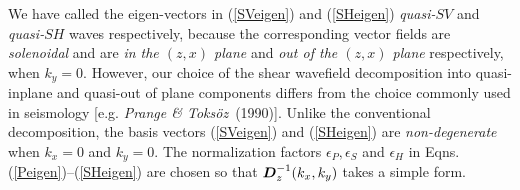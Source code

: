 \documentclass[11pt]{article}
\newcommand{\bmi}[1]{\mbox{\boldmath$\mit #1$\unboldmath}}
\begin{document}
We have called the eigen-vectors in (\ref{SVeigen}) and (\ref{SHeigen})
{\em quasi-\/}$SV$ and {\em quasi-\/}$SH$ waves respectively, because the
corresponding vector fields are {\em solenoidal\/} and are {\em in the
$(z,x)$ plane\/}
and {\em out of the $(z,x)$ plane\/} respectively, when $k_{y}=0$. However, our
choice of the  shear wavefield decomposition into quasi-inplane and quasi-out
of plane components
differs from the choice commonly used in seismology [e.g.
{\em Prange \& Toks\"oz}~(1990)]. Unlike the conventional decomposition,  the basis vectors
(\ref{SVeigen}) and (\ref{SHeigen}) are {\em non-degenerate\/} when
${k}_{x}=0$ and ${k}_{y}=0$.
The normalization factors ${\epsilon}_{P},{\epsilon}_{S} $ and
${\epsilon}_{H}$
in Eqns.(\ref{Peigen})--(\ref{SHeigen}) are chosen so that ${\bmi
D}_{z}^{-1}({k}_{x},{k}_{y})$
takes a simple form.
\end{document}
